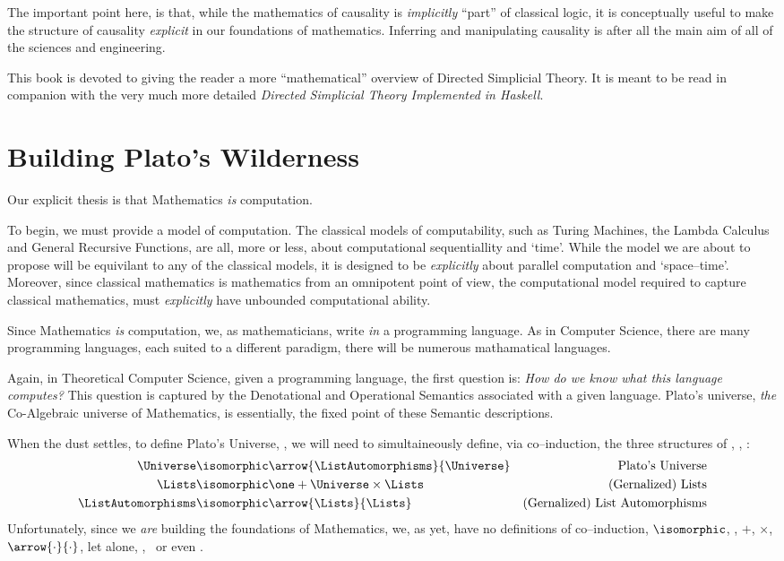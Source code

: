 \documentclass[a4paper,openany]{amsbook}
\begin{document}
The important point here, is that, while the mathematics of causality is
\emph{implicitly} ``part'' of classical logic, it is conceptually useful to make
the structure of causality \emph{explicit} in our foundations of mathematics. 
Inferring and manipulating causality is after all the main aim of all of the
sciences and engineering.

This book is devoted to giving the reader a more ``mathematical'' overview of
Directed Simplicial Theory.  It is meant to be read in companion with the very
much more detailed \textit{Directed Simplicial Theory Implemented in Haskell}.

\section{Building Plato's Wilderness}

Our explicit thesis is that Mathematics \emph{is} computation.

To begin, we must provide a model of computation. The classical models of
computability, such as Turing Machines, the Lambda Calculus and General
Recursive Functions, are all, more or less, about computational sequentiallity
and `time'. While the model we are about to propose will be equivilant to any of
the classical models, it is designed to be \emph{explicitly} about parallel
computation and `space--time'. Moreover, since classical mathematics is
mathematics from an omnipotent point of view, the computational model required
to capture classical mathematics, must \emph{explicitly} have unbounded
computational ability.

Since Mathematics \emph{is} computation, we, as mathematicians, write \emph{in}
a programming language. As in Computer Science, there are many programming
languages, each suited to a different paradigm, there will be numerous
mathamatical languages.

Again, in Theoretical Computer Science, given a programming language, the first
question is: \emph{How do we know what this language computes?} This question is
captured by the Denotational and Operational Semantics associated with a given
language. Plato's universe, \emph{the} Co-Algebraic universe of Mathematics,
is essentially, the fixed point of these Semantic descriptions.

When the dust settles, to define Plato's Universe, \Universe, we will need to
simultaineously define, via co--induction, the three structures of \Universe,
\Lists, \ListAutomorphisms:
%
\begin{align}
   \Universe          & \isomorphic \arrow{\ListAutomorphisms}{\Universe} & \text{Plato's Universe} \\
   \Lists             & \isomorphic \one + \Universe \times \Lists        & \text{(Gernalized) Lists} \\
   \ListAutomorphisms & \isomorphic \arrow{\Lists}{\Lists}                & \text{(Gernalized) List Automorphisms}
\end{align}
%
Unfortunately, since we \emph{are} building the foundations of Mathematics, we,
as yet, have no definitions of co--induction, $\isomorphic$, \one, $+$, $\times$,
$\arrow{\cdot}{\cdot}$, let alone, \Universe, \Lists\ or even \ListAutomorphisms.
\end{document}
